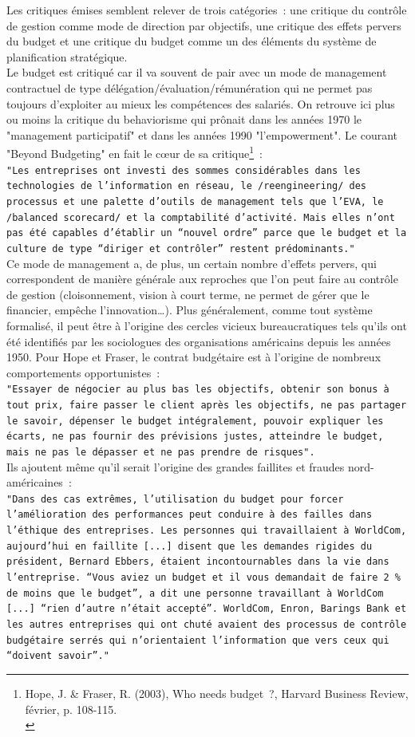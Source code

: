 \documentclass{tufte-handout}
\begin{document}
Les critiques émises semblent relever de trois catégories : une critique du contrôle de gestion comme mode de direction par objectifs, une critique des effets pervers du budget et une critique du budget comme un des éléments du système de planification stratégique.\\
Le budget est critiqué car il va souvent de pair avec un mode de management contractuel de type délégation/évaluation/rémunération qui ne permet pas toujours d'exploiter au mieux les compétences des salariés. On retrouve ici plus ou moins la critique du behaviorisme qui prônait dans les années 1970 le "management participatif" et dans les années 1990 "l'empowerment". Le courant "Beyond Budgeting" en fait le cœur de sa critique\footnote{Hope, J. \& Fraser, R. (2003), Who needs budget ?, Harvard Business Review, février, p. 108-115.\\} :\\
\texttt{"Les entreprises ont investi des sommes considérables dans les technologies de l'information en réseau, le /reengineering/ des processus et une palette d'outils de management tels que l'EVA, le /balanced scorecard/ et la comptabilité d'activité. Mais elles n'ont pas été capables d'établir un “nouvel ordre” parce que le budget et la culture de type “diriger et contrôler” restent prédominants."}\\
Ce mode de management a, de plus, un certain nombre d'effets pervers, qui correspondent de manière générale aux reproches que l'on peut faire au contrôle de gestion (cloisonnement, vision à court terme, ne permet de gérer que le financier, empêche l'innovation\ldots{}). Plus généralement, comme tout système formalisé, il peut être à l'origine des cercles vicieux bureaucratiques tels qu'ils ont été identifiés par les sociologues des organisations américains depuis les années 1950. Pour Hope et Fraser, le contrat budgétaire est à l'origine de nombreux comportements opportunistes :\\
\texttt{"Essayer de négocier au plus bas les objectifs, obtenir son bonus à tout prix, faire passer le client après les objectifs, ne pas partager le savoir, dépenser le budget intégralement, pouvoir expliquer les écarts, ne pas fournir des prévisions justes, atteindre le budget, mais ne pas le dépasser et ne pas prendre de risques".}\\
Ils ajoutent même qu'il serait l'origine des grandes faillites et fraudes nord-américaines :\\
\texttt{"Dans des cas extrêmes, l'utilisation du budget pour forcer l'amélioration des performances peut conduire à des failles dans l'éthique des entreprises. Les personnes qui travaillaient à WorldCom, aujourd'hui en faillite [...] disent que les demandes rigides du président, Bernard Ebbers, étaient incontournables dans la vie dans l'entreprise. “Vous aviez un budget et il vous demandait de faire 2 \% de moins que le budget”, a dit une personne travaillant à WorldCom [...] “rien d'autre n'était accepté”. WorldCom, Enron, Barings Bank et les autres entreprises qui ont chuté avaient des processus de contrôle budgétaire serrés qui n'orientaient l'information que vers ceux qui “doivent savoir”."}\\
\end{document}
